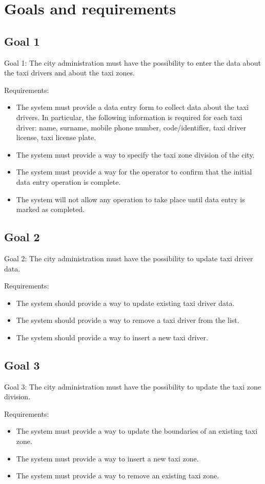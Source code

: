 \section{Goals and requirements}
\subsection{Goal 1}
Goal 1: The city administration must have the possibility to enter the data about the taxi drivers and about the taxi zones. 

Requirements:
\begin{itemize}
\item The system must provide a data entry form to collect data about the taxi drivers. In particular, the following information is required for each taxi driver: name, surname, mobile phone number, code/identifier, taxi driver license, taxi license plate.
\item The system must provide a way to specify the taxi zone division of the city. 
\item The system must provide a way for the operator to confirm that the initial data entry operation is complete. 
\item The system will not allow any operation to take place until data entry is marked as completed. 
\end{itemize}

\subsection{Goal 2}
Goal 2: The city administration must have the possibility to update taxi driver data.

Requirements:
\begin{itemize}
\item The system should provide a way to update existing taxi driver data. 
\item The system should provide a way to remove a taxi driver from the list.
\item The system should provide a way to insert a new taxi driver.
\end{itemize}

\subsection{Goal 3}
Goal 3: The city administration must have the possibility to update the taxi zone division.

Requirements:
\begin{itemize}
\item The system must provide a way to update the boundaries of an existing taxi zone. 
\item The system must provide a way to insert a new taxi zone.
\item The system must provide a way to remove an existing taxi zone.
\end{itemize}

